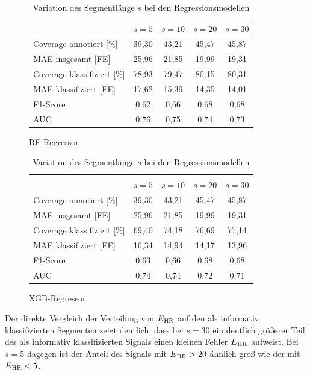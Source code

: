 \begin{table}[H]
	\begin{subfigure}{\textwidth}
	\centering
	\begin{tabular}{l || c | c | c | c }
								& $s = 5$	& $s=10$		& $s=20$		& $s=30$	\\ \hline
	Coverage annotiert [\%]		& 39,30		& 43,21	 	& 45,47		& 45,87\\
	\ac{MAE} insgesamt [FE]		& 25,96		& 21,85		& 19,99		& 19,31\\\hline
 	Coverage klassifiziert [\%]	& 78,93		& 79,47 		& 80,15		& 80,31\\
 	\ac{MAE} klassifiziert [FE]	& 17,62		& 15,39		& 14,35		& 14,01\\
 	F1-Score 					& 0,62		& 0,66		& 0,68		& 0,68\\
 	AUC 						& 0,76		& 0,75		& 0,74		& 0,73\\
 	\end{tabular}		
	\caption{\ac{RF}-Regressor}
	\end{subfigure}
	\begin{subfigure}{\textwidth}
	\centering
	\begin{tabular}{l || c | c | c | c } %
	\multicolumn{5}{l}{	}	\\
								& $s = 5$	& $s=10$		& $s=20$		& $s=30$	\\ \hline
	Coverage annotiert [\%]		& 39,30		& 43,21	 	& 45,47		& 45,87\\
	\ac{MAE} insgesamt [FE]		& 25,96		& 21,85		& 19,99		& 19,31\\\hline
 	Coverage klassifiziert [\%]	& 69,40		& 74,18 		& 76,69		& 77,14\\
 	\ac{MAE} klassifiziert [FE]	& 16,34		& 14,94		& 14,17		& 13,96\\
 	F1-Score 					& 0,63		& 0,66		& 0,68		& 0,68\\
 	AUC 						& 0,74		& 0,74		& 0,72		& 0,71\\
 	\end{tabular}
	\caption{\ac{XGB}-Regressor}
	\end{subfigure}
	\caption{Variation des Segmentlänge $s$ bei den Regressionsmodellen}
	\label{fig:var-s-regr}
\end{table}

Der direkte Vergleich der Verteilung von $E\textsubscript{HR}$ auf den als informativ klassifizierten Segmenten zeigt deutlich, dass bei $s=30$ ein deutlich größerer Teil des als informativ klassifizierten Signals einen kleinen Fehler $E\textsubscript{HR}$ aufweist. Bei $s=5$ dagegen ist der Anteil des Signals mit $E\textsubscript{HR} > 20$ ähnlich groß wie der mit $E\textsubscript{HR} < 5$.

